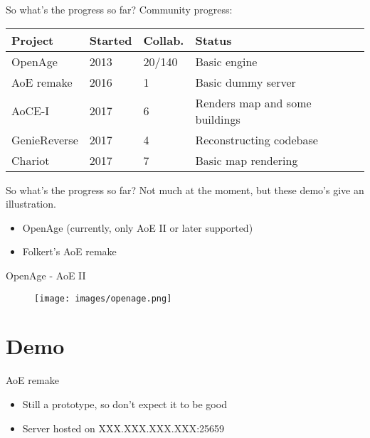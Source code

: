 \documentclass{beamer}
\begin{document}

\begin{frame}{So what's the progress so far?}
	Community progress:
	\begin{tabular}{l|l|l|l}
		Project & Started & Collab. & Status \\ \hline
		OpenAge & 2013 & 20/140 & Basic engine \\
		AoE remake & 2016 & 1 & Basic dummy server \\
		AoCE-I & 2017 & 6 & Renders map and some buildings \\
		GenieReverse & 2017 & 4 & Reconstructing codebase \\
		Chariot & 2017 & 7 & Basic map rendering \\ %
	\end{tabular}

\end{frame}


\begin{frame}{So what's the progress so far?}
	Not much at the moment, but these demo's give an illustration.

	\begin{itemize}
		\item OpenAge (currently, only AoE II or later supported)
		\item Folkert's AoE remake
	\end{itemize}
\end{frame}


\begin{frame}{OpenAge - AoE II}
	\begin{figure}
	\texttt{[image: images/openage.png]}
	\end{figure}
\end{frame}


\section{Demo}

\begin{frame}{AoE remake}
	\begin{itemize}
		\item Still a prototype, so don't expect it to be good
		\item Server hosted on XXX.XXX.XXX.XXX:25659
	\end{itemize}
\end{frame}
\end{document}
